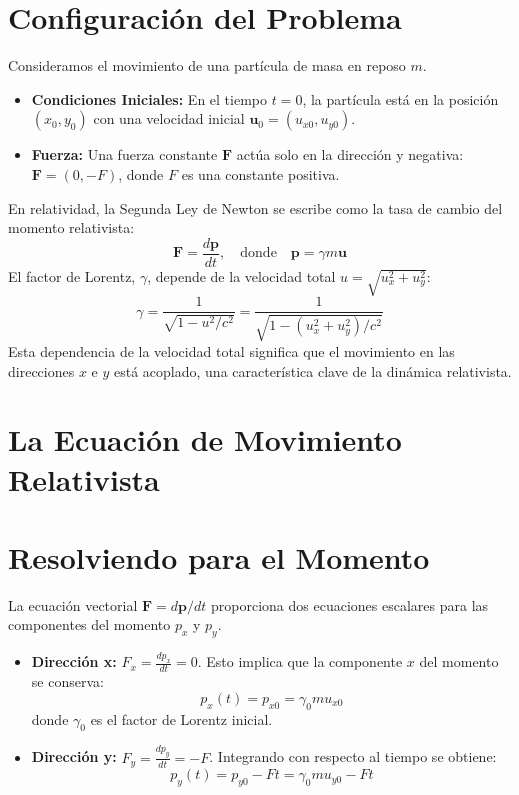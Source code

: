 \documentclass[11pt,a4paper]{book}
\begin{document}
\section{Configuración del Problema}
Consideramos el movimiento de una partícula de masa en reposo $m$.
\begin{itemize}
    \item \textbf{Condiciones Iniciales:} En el tiempo $t=0$, la partícula está en la posición $(x_0, y_0)$ con una velocidad inicial $\boldsymbol{u}_0 = (u_{x0}, u_{y0})$.
    \item \textbf{Fuerza:} Una fuerza constante $\boldsymbol{F}$ actúa solo en la dirección y negativa: $\boldsymbol{F} = (0, -F)$, donde $F$ es una constante positiva.
\end{itemize}
En relatividad, la Segunda Ley de Newton se escribe como la tasa de cambio del momento relativista:
\[ \boldsymbol{F} = \frac{d\boldsymbol{p}}{dt}, \quad \text{donde} \quad \boldsymbol{p} = \gamma m \boldsymbol{u} \]
El factor de Lorentz, $\gamma$, depende de la velocidad total $u = \sqrt{u_x^2 + u_y^2}$:
\[ \gamma = \frac{1}{\sqrt{1 - u^2/c^2}} = \frac{1}{\sqrt{1 - (u_x^2 + u_y^2)/c^2}} \]
Esta dependencia de la velocidad total significa que el movimiento en las direcciones $x$ e $y$ está acoplado, una característica clave de la dinámica relativista.

\section{La Ecuación de Movimiento Relativista}

\section{Resolviendo para el Momento}
La ecuación vectorial $\boldsymbol{F} = d\boldsymbol{p}/dt$ proporciona dos ecuaciones escalares para las componentes del momento $p_x$ y $p_y$.
\begin{itemize}
    \item \textbf{Dirección x:} $F_x = \frac{dp_x}{dt} = 0$. Esto implica que la componente $x$ del momento se conserva:
    \[ p_x(t) = p_{x0} = \gamma_0 m u_{x0} \]
    donde $\gamma_0$ es el factor de Lorentz inicial.
    \item \textbf{Dirección y:} $F_y = \frac{dp_y}{dt} = -F$. Integrando con respecto al tiempo se obtiene:
    \[ p_y(t) = p_{y0} - Ft = \gamma_0 m u_{y0} - Ft \]
\end{itemize}
\end{document}
